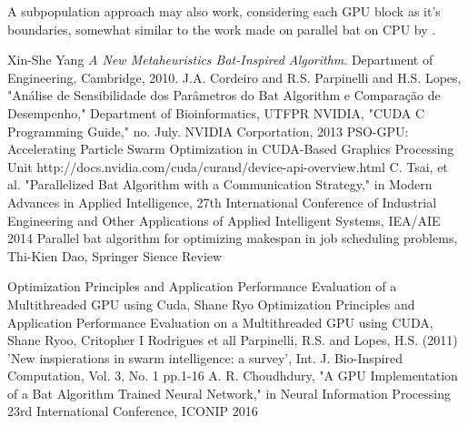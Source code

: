 \documentclass[conference]{IEEEtran}
\begin{document}
A subpopulation approach may also work, considering each GPU block as
it's boundaries, somewhat similar to the work made on parallel bat on
CPU by \cite{paralellCPU}.

\begin{thebibliography}{1}
    Xin-She Yang \emph{A New Metaheuristics Bat-Inspired Algorithm}. Department of Engineering, Cambridge, 2010.
    J.A. Cordeiro and R.S. Parpinelli and H.S. Lopes, "Análise de Sensibilidade dos Parâmetros do Bat Algorithm e Comparação de Desempenho," Department of Bioinformatics, UTFPR
    NVIDIA, "CUDA C Programming Guide," no. July. NVIDIA Corportation, 2013
    PSO-GPU: Accelerating Particle Swarm Optimization in CUDA-Based Graphics Processing Unit
    http://docs.nvidia.com/cuda/curand/device-api-overview.html
    C. Tsai, et al. "Parallelized Bat Algorithm with a Communication Strategy," in Modern Advances in Applied Intelligence, 27th International Conference of Industrial Engineering and Other Applications of Applied Intelligent Systems, IEA/AIE 2014
    Parallel bat algorithm for optimizing makespan in job scheduling problems, Thi-Kien Dao, Springer Sience Review

    Optimization Principles and Application Performance Evaluation of a Multithreaded GPU using Cuda, Shane Ryo
    Optimization Principles and Application Performance Evaluation on a Multithreaded GPU using CUDA, Shane Ryoo, Critopher I Rodrigues et all
    Parpinelli, R.S. and Lopes, H.S. (2011) 'New inspierations in swarm intelligence: a survey', Int. J. Bio-Inspired Computation, Vol. 3, No. 1 pp.1-16
A. R. Choudhdury, "A GPU Implementation of a Bat Algorithm Trained Neural Network," in Neural Information Processing 23rd International Conference, ICONIP 2016
\end{thebibliography}
\end{document}
